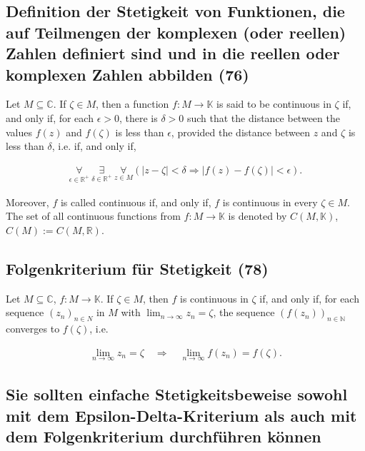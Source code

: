 \subsection{Definition der Stetigkeit von Funktionen, die auf Teilmengen der komplexen (oder reellen) Zahlen definiert sind und in die reellen oder komplexen Zahlen abbilden (76)}

Let $M \subseteq \mathbb { C }$. If $\zeta \in M$, then a function $f : M \rightarrow \mathbb { K }$ is said to be
continuous in $\zeta$ if, and only if, for each $\epsilon > 0$, there is $\delta > 0$ such that the distance
between the values $f(z)$ and $f(\zeta)$ is less than $\epsilon$, provided the distance between $z$ and $\zeta$
is less than $\delta$, i.e. if, and only if,

\begin{align}
\underset{\epsilon \in \mathbb{R^+}}{\forall} \ \underset{\delta \in \mathbb{R^+}}{\exists} \ \underset{z \in M}{\forall} ( | z - \zeta | < \delta \Rightarrow | f ( z ) - f ( \zeta ) | < \epsilon ).
\end{align}

Moreover, $f$ is called continuous if, and only if, $f$ is continuous in every $\zeta \in M$. The set of
all continuous functions from $f : M \rightarrow \mathbb { K }$ is denoted by $C ( M ,\mathbb { K } )$, $C(M) := C(M,\mathbb{R})$.

\subsection{Folgenkriterium für Stetigkeit (78)}

Let $M \subseteq \mathbb { C }$, $f : M \rightarrow \mathbb { K }$. If $\zeta \in M$, then $f$ is continuous in $\zeta$ if, and only if, for each sequence $\left( z _ { n } \right) _ { n \in N }$ in $M$ with $\lim _ { n \rightarrow \infty } z _ { n } = \zeta$, the sequence $(f(z_n))_{n\in\mathbb{N}}$ converges to $f(\zeta)$, i.e.

\begin{align}
\lim _ { n \rightarrow \infty } z _ { n } = \zeta \quad \Rightarrow \quad \lim _ { n \rightarrow \infty } f \left( z _ { n } \right) = f ( \zeta ).
\end{align}

\subsection{Sie sollten einfache Stetigkeitsbeweise sowohl mit dem Epsilon-Delta-Kriterium als auch mit dem Folgenkriterium durchführen können}

